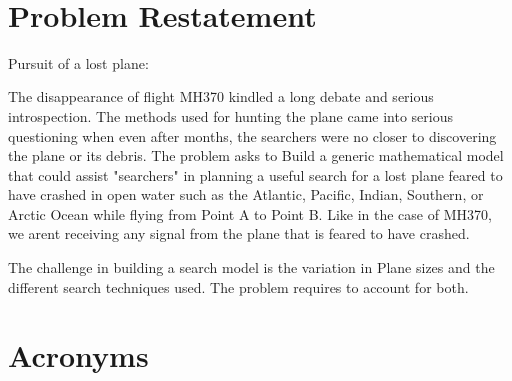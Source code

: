 \documentclass[12pt, letterpaper]{article}  %
\theoremstyle{definition}
\theoremstyle{remark}
\theoremstyle{plain}
\begin{document}
\newpage



   \doublespacing


\tableofcontents
\ \\

\newpage

\setcounter{page}{1}   




\section{Problem Restatement}\label{sec:restate}


Pursuit of a lost plane:

The disappearance of flight MH370 kindled a long debate and serious introspection. The methods used for hunting the plane came into serious questioning when even after months, the searchers were no closer to discovering the plane or its debris. 
The problem asks to Build a generic mathematical model that could assist "searchers" in planning a useful search for a lost plane feared to have crashed in open water such as the Atlantic, Pacific, Indian, Southern, or Arctic Ocean while flying from Point A to Point B. Like in the case of MH370, we arent receiving any signal from the plane that is feared to have crashed. 

The challenge in building a search model is the variation in Plane sizes and the different search techniques used. The problem requires to account for both.


\section{Acronyms}\label{sec:terms}
\end{document}
